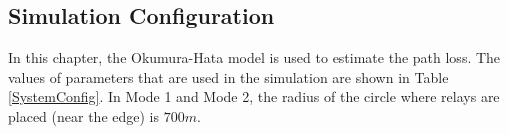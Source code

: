 
\subsection{Simulation Configuration}
In this chapter, the Okumura-Hata model \cite{saunders2007antennas} is used to estimate the path loss.
The values of parameters that are used in the simulation are shown in Table \ref{SystemConfig}. In Mode 1 and Mode 2, the radius of the circle where relays are placed (near the edge) is $700m$.
